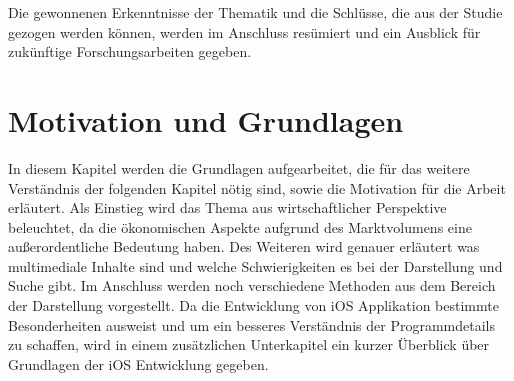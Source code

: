 \documentclass[11pt,a4paper]{report}
\begin{document}
Die gewonnenen Erkenntnisse der Thematik und die Schlüsse, die aus der Studie gezogen werden können, werden im Anschluss resümiert und ein Ausblick für zukünftige Forschungsarbeiten gegeben.

\chapter{Motivation und Grundlagen}

In diesem Kapitel werden die Grundlagen aufgearbeitet, die für das weitere Verständnis der folgenden Kapitel nötig sind, sowie die Motivation für die Arbeit erläutert. Als Einstieg wird das Thema aus wirtschaftlicher Perspektive beleuchtet, da die ökonomischen Aspekte aufgrund des Marktvolumens eine außerordentliche Bedeutung haben. Des Weiteren wird genauer erläutert was multimediale Inhalte sind und welche Schwierigkeiten es bei der Darstellung und Suche gibt. Im Anschluss werden noch verschiedene Methoden aus dem Bereich der Darstellung vorgestellt. Da die Entwicklung von iOS Applikation bestimmte Besonderheiten ausweist und um ein besseres Verständnis der Programmdetails zu schaffen, wird in einem zusätzlichen Unterkapitel ein kurzer Überblick über Grundlagen der iOS Entwicklung gegeben.
\end{document}

